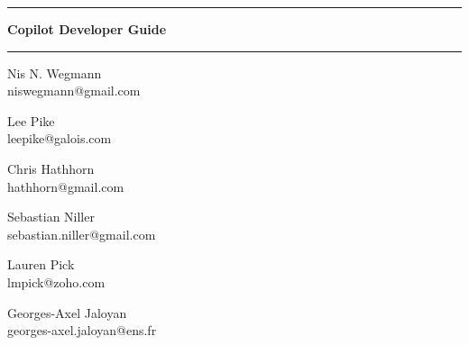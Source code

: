 \documentclass[12pt]{article}
\theoremstyle{example}
\newcommand{\HRule}{\rule{\linewidth}{0.25pt}}
\begin{document}
\vspace{0.1cm}

\HRule

\vspace{0.6cm}

{\Huge \bfseries
Copilot Developer Guide
}


\HRule

\vspace{0.6cm}

\begin{minipage}{0.4\textwidth}
\large
\begin{center}
Nis N. Wegmann\\
\small{
niswegmann@gmail.com\\
}

\end{center}
\end{minipage}
\begin{minipage}{0.4\textwidth}
\large
\begin{center}
Lee Pike\\
\small{
leepike@galois.com\\
}
\end{center}
\end{minipage}
\vspace{1cm}



\begin{minipage}{0.3\textwidth}
\large
\begin{center}
Chris Hathhorn \\
\small{
hathhorn@gmail.com\\
}
\end{center}
\end{minipage}
\begin{minipage}{0.3\textwidth}
\large
\begin{center}
Sebastian Niller\\
\small{
sebastian.niller@gmail.com\\
}
\end{center}
\end{minipage}

\vspace{1cm}

\begin{minipage}{0.3\textwidth}
\large
\begin{center}
Lauren Pick\\
\small{
lmpick@zoho.com\\
}
\end{center}
\end{minipage}
\begin{minipage}{0.3\textwidth}
\large
\begin{center}
Georges-Axel Jaloyan \\
\small{
georges-axel.jaloyan@ens.fr\\
}
\end{center}
\end{minipage}

\vspace{1cm}











\end{document}
